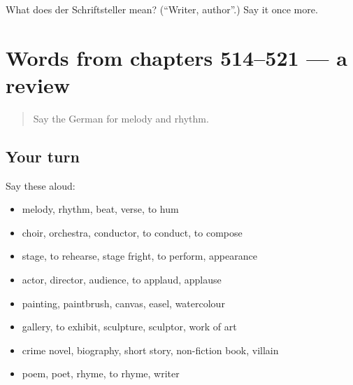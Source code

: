 \begin{tcolorbox}[breakable,colback=teal!4,colframe=teal!35!black,title={Before you move on}]
What does der Schriftsteller mean? (\textquotedblleft{}Writer, author\textquotedblright{}.) Say it once more.
\end{tcolorbox}
\section[(dialogue)]{Words from chapters 514–521 — a review}

\label{lesson:GE-R521-review-514-521}



\begin{quote}
Say the German for melody and rhythm.
\end{quote}

\subsection*{Your turn}
Say these aloud:

\begin{itemize}
\raggedright
  \item melody, rhythm, beat, verse, to hum
  \item choir, orchestra, conductor, to conduct, to compose
  \item stage, to rehearse, stage fright, to perform, appearance
  \item actor, director, audience, to applaud, applause
  \item painting, paintbrush, canvas, easel, watercolour
  \item gallery, to exhibit, sculpture, sculptor, work of art
  \item crime novel, biography, short story, non-fiction book, villain
  \item poem, poet, rhyme, to rhyme, writer
\end{itemize}

